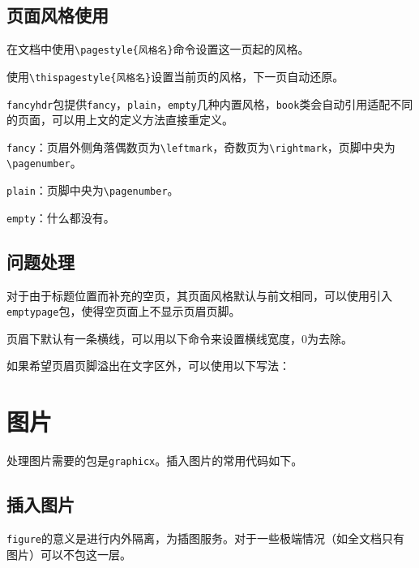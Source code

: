 \documentclass[10pt,openany]{book}
\begin{document}
\begin{sloppypar}
\section{页面风格使用}

在文档中使用\texttt{\textbackslash{}pagestyle\{风格名\}}命令设置这一页起的风格。

使用\texttt{\textbackslash{}thispagestyle\{风格名\}}设置当前页的风格，下一页自动还原。

\texttt{fancyhdr}包提供\texttt{fancy}，\texttt{plain}，\texttt{empty}几种内置风格，\texttt{book}类会自动引用适配不同的页面，可以用上文的定义方法直接重定义。

\texttt{fancy}：页眉外侧角落偶数页为\texttt{\textbackslash{}leftmark}，奇数页为\texttt{\textbackslash{}rightmark}，页脚中央为\texttt{\textbackslash{}pagenumber}。

\texttt{plain}：页脚中央为\texttt{\textbackslash{}pagenumber}。

\texttt{empty}：什么都没有。

\section{问题处理}

对于由于标题位置而补充的空页，其页面风格默认与前文相同，可以使用引入\texttt{emptypage}包，使得空页面上不显示页眉页脚。

页眉下默认有一条横线，可以用以下命令来设置横线宽度，0为去除。



如果希望页眉页脚溢出在文字区外，可以使用以下写法：



\chapter{图片}

处理图片需要的包是\texttt{graphicx}。插入图片的常用代码如下。

\section{插入图片}



\texttt{figure}的意义是进行内外隔离，为插图服务。对于一些极端情况（如全文档只有图片）可以不包这一层。


\end{sloppypar}
\end{document}
